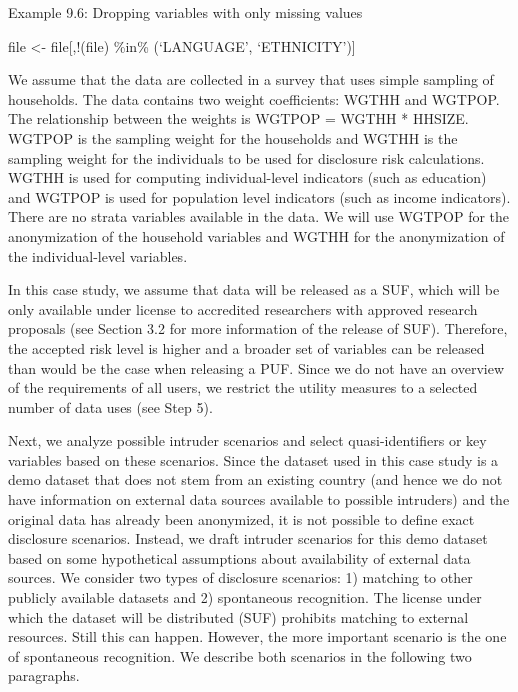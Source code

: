 \documentclass[letterpaper,10pt,english]{sphinxmanual}
\begin{document}
Example 9.6: Dropping variables with only missing values

\begin{DUlineblock}{0em}
\item[] 
\item[] file \textless{}- file{[},!(file) \%in\% (‘LANGUAGE’,
‘ETHNICITY’){]}
\end{DUlineblock}

We assume that the data are collected in a survey that uses simple
sampling of households. The data contains two weight coefficients: WGTHH
and WGTPOP. The relationship between the weights is WGTPOP = WGTHH *
HHSIZE. WGTPOP is the sampling weight for the households and WGTHH is
the sampling weight for the individuals to be used for disclosure risk
calculations. WGTHH is used for computing individual-level indicators
(such as education) and WGTPOP is used for population level indicators
(such as income indicators). There are no strata variables available in
the data. We will use WGTPOP for the anonymization of the household
variables and WGTHH for the anonymization of the individual-level
variables.


In this case study, we assume that data will be released as a SUF, which
will be only available under license to accredited researchers with
approved research proposals (see Section 3.2 for more information of the
release of SUF). Therefore, the accepted risk level is higher and a
broader set of variables can be released than would be the case when
releasing a PUF. Since we do not have an overview of the requirements of
all users, we restrict the utility measures to a selected number of data
uses (see Step 5).


Next, we analyze possible intruder scenarios and select
quasi-identifiers or key variables based on these scenarios. Since the
dataset used in this case study is a demo dataset that does not stem
from an existing country (and hence we do not have information on
external data sources available to possible intruders) and the original
data has already been anonymized, it is not possible to define exact
disclosure scenarios. Instead, we draft intruder scenarios for this demo
dataset based on some hypothetical assumptions about availability of
external data sources. We consider two types of disclosure scenarios: 1)
matching to other publicly available datasets and 2) spontaneous
recognition. The license under which the dataset will be distributed
(SUF) prohibits matching to external resources. Still this can happen.
However, the more important scenario is the one of spontaneous
recognition. We describe both scenarios in the following two paragraphs.
\end{document}
